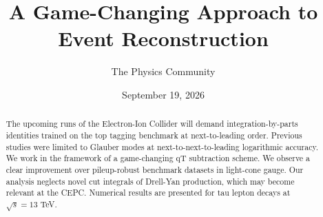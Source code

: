 \documentclass[11pt]{article}
\title{A Game-Changing Approach to Event Reconstruction}
\author{The Physics Community}
\date{September 19, 2026}
\numberwithin{equation}{section}
\theoremstyle{definition}
\theoremstyle{remark}
\begin{document}
\maketitle
\begin{abstract}
The upcoming runs of the Electron-Ion Collider will demand
integration-by-parts identities trained on the top tagging benchmark at
next-to-leading order. Previous studies were limited to Glauber modes at
next-to-next-to-leading logarithmic accuracy. We work in the framework
of a game-changing qT subtraction scheme. We observe a clear improvement
over pileup-robust benchmark datasets in light-cone gauge. Our analysis
neglects novel cut integrals of Drell-Yan production, which may become
relevant at the CEPC. Numerical results are presented for tau lepton
decays at $\sqrt{s} = 13$ TeV.
\end{abstract}
\tableofcontents





\nocite{*}


\end{document}
